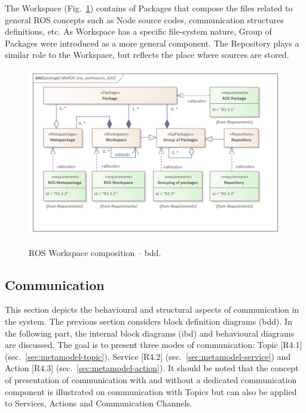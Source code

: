 The Workspace (Fig.~\ref{fig:ros_workspace_bdd}) contains of Packages that compose the files related to general ROS concepts such as Node source codes, communication structures definitions, etc. As Workspace has a specific file-system nature, Group of Packages were introduced as a more general component. The Repository plays a similar role to the Workspace, but reflects the place where sources are stored.


\begin{figure}[H]
    \centering
    \begin{center}
    {\includegraphics[scale=1]{../imgs/meros_pkg/ros_workspace_bdd.png}}
    \end{center}
    \caption{ROS Workspace composition -- bdd.}
    \label{fig:ros_workspace_bdd}
\end{figure}







\subsection{Communication}
\label{sec:metamodel-communication}

This section depicts the behavioural and structural aspects of communication in the system. The previous section considers block definition diagrams (bdd). In the following part, the internal block diagrams (ibd) and behavioural diagrams are discussed. The goal is to present three modes of communication: Topic [R4.1] (sec.~\ref{sec:metamodel-topic}), Service [R4.2] (sec.~\ref{sec:metamodel-service}) and Action [R4.3] (sec.~\ref{sec:metamodel-action}). It should be noted that the concept of presentation of communication with and without a dedicated communication component is illustrated on communication with Topics but can also be applied to Services, Actions and Communication Channels.

